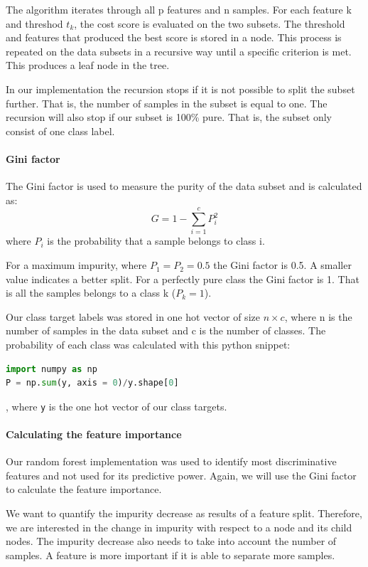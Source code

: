 The algorithm iterates through all p features and n samples. For each feature k
and threshod $t_k$, the cost score is evaluated on the two subsets. The
threshold and features that produced the best score is stored in a node. This
process is repeated on the data subsets in a recursive way until a specific
criterion is met. This produces a leaf node in the tree. 

In our implementation the recursion stops if it is not possible to split the
subset further. That is, the number of samples in the subset is equal to one.   
The recursion will also stop if our subset is 100\% pure. That is, the subset
only consist of one class label.  

\paragraph{Gini factor} \label{sec:gini_factor} \hfill

The Gini factor is used to measure the purity of the data subset and is
calculated as:
\begin{equation*}
    G = 1 - \sum_{i=1}^{c} P_i ^2 
\end{equation*}
where $P_i$ is the probability that a sample belongs to class i. 

For a maximum impurity, where $P_1 = P_2 = 0.5$ the Gini factor is 0.5. A
smaller value indicates a better split. For a perfectly pure class the Gini
factor is 1. That is all the samples belongs to a class k ($P_k = 1$).     


Our class target labels was stored in one hot vector of size $n \times c$, 
where n is the number of samples in the data subset and c is the number of
classes. The probability of each class was calculated with this python snippet:
\begin{lstlisting}[language=Python]
import numpy as np
P = np.sum(y, axis = 0)/y.shape[0]
\end{lstlisting},
where \verb|y| is the one hot vector of our class targets. 

\paragraph{Calculating the feature importance} \hfill
Our random forest implementation was used to identify most discriminative
features and not used for its predictive power. Again, we will use the Gini
factor to calculate the feature importance. 


We want to quantify the impurity decrease as results of a feature split.
Therefore, we are interested in the change in impurity with respect to a node and its
child nodes. The impurity decrease also needs to take into account the number
of samples. A feature is more important if it is able to separate more samples.       

